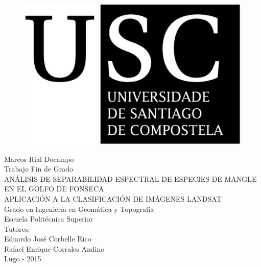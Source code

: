 




\begin{figure}[t]
\centering
\includegraphics[scale=0.15]{./Imagenes/USCbn.eps} %
\end{figure}

\begin{center}
\vspace*{2cm}
{\LARGE Marcos Rial Docampo}\\[2cm]
{\LARGE Trabajo Fin de Grado}\\[1cm]
{\LARGE ANÁLISIS DE SEPARABILIDAD ESPECTRAL DE ESPECIES DE MANGLE EN EL GOLFO DE FONSECA}\\
{\LARGE APLICACIÓN A LA CLASIFICACIÓN DE IMÁGENES LANDSAT}\\[2cm]
{\Large Grado en Ingeniería en Geomática y Topografía\\Escuela Politécnica Superior}\\[1cm]
{\Large \vfill{Tutores:\\Eduardo José Corbelle Rico\\Rafael Enrique Corrales Andino}}\\
{\footnotesize \vfill{Lugo - 2015}}
\end{center}